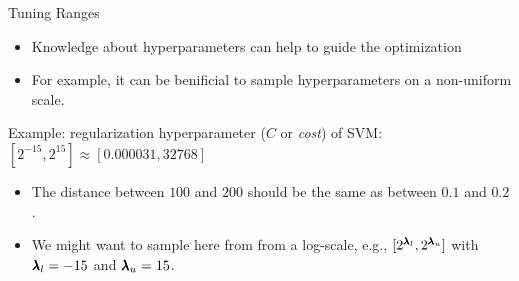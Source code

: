 
\subtitle{Example and Practical Hints}





\maketitle



\begin{frame}[allowframebreaks]{Tuning Ranges}

\begin{itemize}
	\item Knowledge about hyperparameters can help to guide the optimization
	\item For example, it can be benificial to sample hyperparameters on a non-uniform scale.
\end{itemize}

    \vspace{0.2cm}
Example: regularization hyperparameter ($C$ or \emph{cost}) of SVM: $[2^{-15}, 2^{15}] \approx [0.000031, 32768]$

\begin{itemize}
	\item The distance between $100$ and $200$ should be the same as between $0.1$ and $0.2$.
  \item We might want to sample here from from a log-scale, e.g., $[2^{\pmb{\lambda}_l}, 2^{\pmb{\lambda}_u}]$ with $\pmb{\lambda}_l = -15$ and $\pmb{\lambda}_u = 15$.
\end{itemize}

\begin{figure}[htb]
\centering


\end{figure}
\end{frame}

